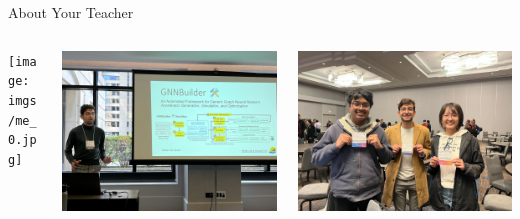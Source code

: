\documentclass[]{beamer}
\begin{document}
\begin{frame}{About Your Teacher}
    \begin{columns}[t]
        \begin{column}{0.33\textwidth}
            \texttt{[image: imgs/me\_0.jpg]}
        \end{column}
        \begin{column}{0.33\textwidth}
            \includegraphics[width=\textwidth]{imgs/me_1.jpg}
        \end{column}
        \begin{column}{0.33\textwidth}
            \includegraphics[width=\textwidth]{imgs/me_2.jpg}
        \end{column}
    \end{columns}

\end{frame}
\end{document}
